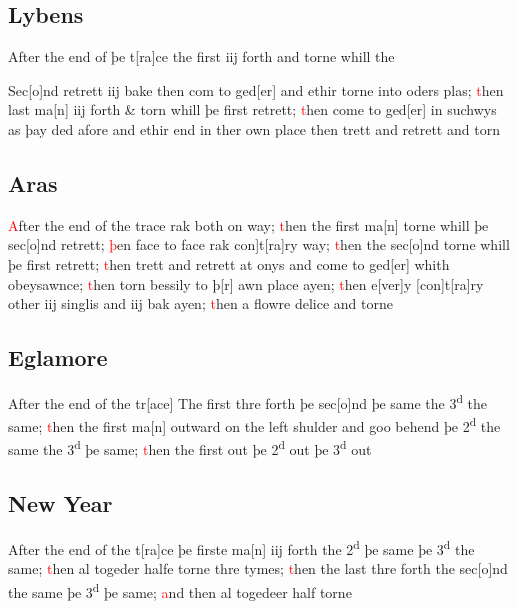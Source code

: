 \documentclass[12pt,letter]{article} %
\newcommand{\red}[1]{\textcolor{red}{#1}}
\newcommand{\srcpg}[1]{
    \noindent{
        \color{Gray}{\rule[0.5ex]{\linewidth}{1pt}~#1} 
        \\
    }
}
\begin{document}
\subsection{Lybens}
After the end of þe t{[}ra{]}ce the first iij forth and torne whill the
\srcpg{64} Sec{[}o{]}nd retrett iij bake then com to ged{[}er{]} and
ethir torne into oders plas; \red{t}hen last ma{[}n{]} iij forth \& torn whill
þe first retrett; \red{t}hen come to ged{[}er{]} in suchwys as þay ded afore
and ethir end in ther own place then trett and retrett and torn

\subsection{Aras}
\red{A}fter the end of the trace rak both on way; \red{t}hen the first ma{[}n{]}
torne whill þe sec{[}o{]}nd retrett; \red{þ}en face to face rak
\marginnote{2}{[}con{]}t{[}ra{]}ry way; \red{t}hen the sec{[}o{]}nd torne whill þe first
retrett; \red{t}hen trett and retrett at onys and come to ged{[}er{]} whith
obeysawnce; \red{t}hen torn bessily to þ{[}r{]} awn place ayen; \red{t}hen
e{[}ver{]}y {[}con{]}t{[}ra{]}ry other iij singlis and iij bak ayen;
\red{t}hen a flowre delice and torne

\subsection{Eglamore}
After the end of the tr{[}ace{]} \srcpg{65} The first thre forth þe
sec{[}o{]}nd þe same the 3\textsuperscript{d} the same; \red{t}hen the first
ma{[}n{]} outward on the left shulder and goo behend þe
2\textsuperscript{d} the same the 3\textsuperscript{d} þe same; \red{t}hen the
first out þe 2\textsuperscript{d} out þe 3\textsuperscript{d} out

\subsection{New Year}
After the end of the t{[}ra{]}ce þe firste ma{[}n{]} iij forth the
2\textsuperscript{d} þe same þe 3\textsuperscript{d} the same; \red{t}hen al
togeder halfe torne thre tymes; \red{t}hen the last thre forth the
sec{[}o{]}nd the same þe 3\textsuperscript{d} þe same; \red{a}nd then al
togedeer half torne
\end{document}
